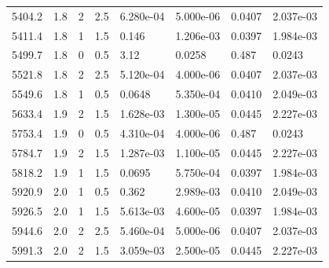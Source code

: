\documentclass[preview]{standalone}
\begin{document}
{{{\begin{tabular}{L{1.2cm}C{1.2cm} C{0.3cm}C{0.5cm} C{1.4cm}C{1.4cm} C{1.4cm}C{1.4cm}}
  5404.2  &   1.8  & 2     & 2.5 &  6.280e-04  & 5.000e-06  & 0.0407 &  2.037e-03   \\ 
  5411.4  &   1.8  & 1     & 1.5 &  0.146  & 1.206e-03  & 0.0397 &  1.984e-03   \\ 
  5499.7  &   1.8  & 0     & 0.5 &  3.12  & 0.0258  & 0.487 &  0.0243   \\ 
  5521.8  &   1.8  & 2     & 2.5 &  5.120e-04  & 4.000e-06  & 0.0407 &  2.037e-03   \\ 
  5549.6  &   1.8  & 1     & 0.5 &  0.0648  & 5.350e-04  & 0.0410 &  2.049e-03   \\ 
  5633.4  &   1.9  & 2     & 1.5 &  1.628e-03  & 1.300e-05  & 0.0445 &  2.227e-03   \\ 
  5753.4  &   1.9  & 0     & 0.5 &  4.310e-04  & 4.000e-06  & 0.487 &  0.0243   \\ 
  5784.7  &   1.9  & 2     & 1.5 &  1.287e-03  & 1.100e-05  & 0.0445 &  2.227e-03   \\ 
  5818.2  &   1.9  & 1     & 1.5 &  0.0695  & 5.750e-04  & 0.0397 &  1.984e-03   \\ 
  5920.9  &   2.0  & 1     & 0.5 &  0.362  & 2.989e-03  & 0.0410 &  2.049e-03   \\ 
  5926.5  &   2.0  & 1     & 1.5 &  5.613e-03  & 4.600e-05  & 0.0397 &  1.984e-03   \\ 
  5944.6  &   2.0  & 2     & 2.5 &  5.460e-04  & 5.000e-06  & 0.0407 &  2.037e-03   \\ 
  5991.3  &   2.0  & 2     & 1.5 &  3.059e-03  & 2.500e-05  & 0.0445 &  2.227e-03   \\ 
\hline 
\end{tabular} 

}}}
\end{document}
